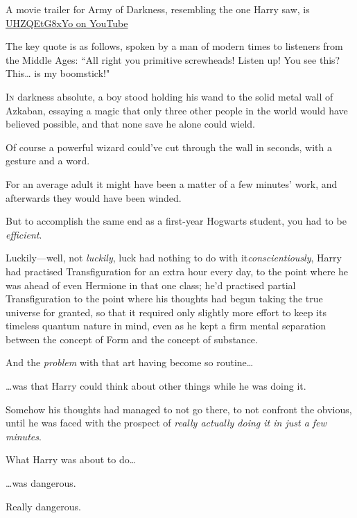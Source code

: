 
\begin{chapterOpeningAuthorNote}
A movie trailer for Army of Darkness, resembling the one Harry saw, is \href{https://www.youtube.com/watch?v=UHZQEtG8xYo}{UHZQEtG8xYo on YouTube}

The key quote is as follows, spoken by a man of modern times to listeners from the Middle Ages:
``All right you primitive screwheads! Listen up! You see this? This{\ldots} is my boomstick!"
\end{chapterOpeningAuthorNote}

\lettrine{I}{n} darkness absolute, a boy stood holding his wand to the solid metal wall of Azkaban, essaying a magic that only three other people in the world would have believed possible, and that none save he alone could wield.

Of course a powerful wizard could've cut through the wall in seconds, with a gesture and a word.

For an average adult it might have been a matter of a few minutes' work, and afterwards they would have been winded.

But to accomplish the same end as a first-year Hogwarts student, you had to be \emph{efficient}.

Luckily—well, not \emph{luckily}, luck had nothing to do with it\emdashhyp\emph{conscientiously}, Harry had practised Transfiguration for an extra hour every day, to the point where he was ahead of even Hermione in that one class; he'd practised partial Transfiguration to the point where his thoughts had begun taking the true universe for granted, so that it required only slightly more effort to keep its timeless quantum nature in mind, even as he kept a firm mental separation between the concept of Form and the concept of substance.

And the \emph{problem} with that art having become so routine{\ldots}

{\ldots}was that Harry could think about other things while he was doing it.

Somehow his thoughts had managed to not go there, to not confront the obvious, until he was faced with the prospect of \emph{really actually doing it in just a few minutes}.

What Harry was about to do{\ldots}

{\ldots}was dangerous.

Really dangerous.

